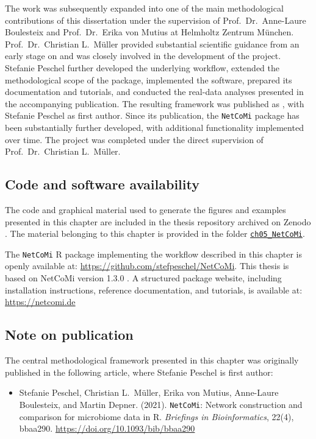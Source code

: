 The work was subsequently expanded into one of the main methodological contributions of this dissertation under the supervision of Prof.\ Dr.\ Anne-Laure Boulesteix and Prof.\ Dr.\ Erika von Mutius at Helmholtz Zentrum München. Prof.\ Dr.\ Christian L.\ Müller provided substantial scientific guidance from an early stage on and was closely involved in the development of the project. Stefanie Peschel further developed the underlying workflow, extended the methodological scope of the package, implemented the software, prepared its documentation and tutorials, and conducted the real-data analyses presented in the accompanying publication. The resulting framework was published as \citet{peschel2021netcomi}, with Stefanie Peschel as first author. Since its publication, the \texttt{NetCoMi} package has been substantially further developed, with additional functionality implemented over time. The project was completed under the direct supervision of Prof.\ Dr.\ Christian L.\ Müller.

\subsection*{Code and software availability}

The code and graphical material used to generate the figures and examples presented in this chapter are included in the thesis repository archived on Zenodo \citep{Peschel2026thesisRepo}. The material belonging to this chapter is provided in the folder \href{https://github.com/stefpeschel/phd_thesis/tree/main/ch05_NetCoMi}{\texttt{ch05\_NetCoMi}}.

The \texttt{NetCoMi} R package implementing the workflow described in this chapter is openly available at: \url{https://github.com/stefpeschel/NetCoMi}. This thesis is based on NetCoMi version 1.3.0 \citep{peschel2026netcomi}.
A structured package website, including installation instructions, reference documentation, and tutorials, is available at:\\ \url{https://netcomi.de}


\subsection*{Note on publication}

The central methodological framework presented in this chapter was originally published in the following article, where Stefanie Peschel is first author:

\begin{itemize}
\item Stefanie Peschel, Christian L.\ Müller, Erika von Mutius, Anne-Laure Boulesteix, and Martin Depner. (2021). \texttt{NetCoMi}: Network construction and comparison for microbiome data in R. \textit{Briefings in Bioinformatics}, 22(4), bbaa290. \url{https://doi.org/10.1093/bib/bbaa290}
\end{itemize}

